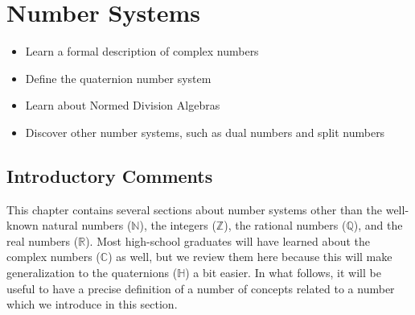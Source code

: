 \chapter{Number Systems}\label{\chabbr:ch:NumberSystems}


\begin{learningobjectives}
{\begin{itemize}
    \item[{\color{OCBurntOrange}\ref{\chabbr:sec:complex}:}] Learn a formal description of complex numbers
    \item[{\color{OCBurntOrange}\ref{\chabbr:sec:quaternions}:}] Define the quaternion number system\\
    \item[{\color{OCBurntOrange}\ref{\chabbr:sec:algebras}:}] Learn about Normed Division Algebras
    \item[{\color{OCBurntOrange}\ref{\chabbr:sec:othernumbers}:}] Discover other number systems, such as dual numbers and split numbers
\end{itemize}}
\end{learningobjectives}



\section{Introductory Comments}
\label{\chabbr:sec:intro}

This chapter contains several sections about number systems other than the well-known natural numbers ($\mathbb{N}$), the integers ($\mathbb{Z}$),
the rational numbers ($\mathbb{Q}$), and the real numbers ($\mathbb{R}$).  Most high-school graduates will have learned about the complex numbers ($\mathbb{C}$) as well, but we review them here because this will make generalization to the quaternions ($\mathbb{H}$) a bit easier.  In what follows, it will be useful to have a precise definition of a number of concepts related to a number  which we introduce in this section.

